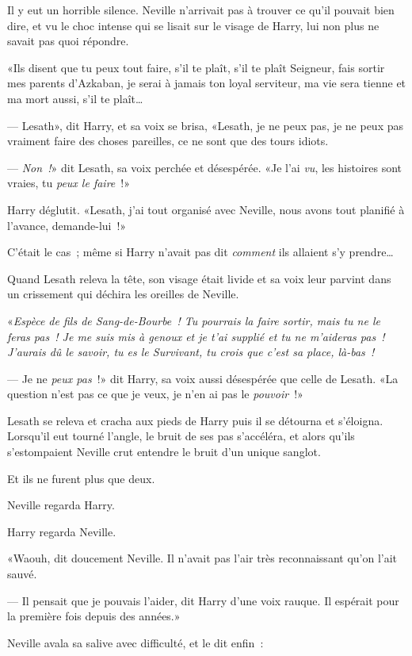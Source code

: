 Il y eut un horrible silence. Neville n'arrivait pas à trouver ce qu'il pouvait bien dire, et vu le choc intense qui se lisait sur le visage de Harry, lui non plus ne savait pas quoi répondre.

«Ils disent que tu peux tout faire, s'il te plaît, s'il te plaît Seigneur, fais sortir mes parents d'Azkaban, je serai à jamais ton loyal serviteur, ma vie sera tienne et ma mort aussi, s'il te plaît…

--- Lesath», dit Harry, et sa voix se brisa, «Lesath, je ne peux pas, je ne peux pas vraiment faire des choses pareilles, ce ne sont que des tours idiots.

--- \emph{Non~!}» dit Lesath, sa voix perchée et désespérée. «Je l'ai \emph{vu}, les histoires sont vraies, tu \emph{peux le faire}~!»

Harry déglutit. «Lesath, j'ai tout organisé avec Neville, nous avons tout planifié à l'avance, demande-lui~!»

C'était le cas~; même si Harry n'avait pas dit \emph{comment} ils allaient s'y prendre…

Quand Lesath releva la tête, son visage était livide et sa voix leur parvint dans un crissement qui déchira les oreilles de Neville.

«\emph{Espèce de fils de Sang-de-Bourbe~! Tu pourrais la faire sortir, mais tu ne le feras pas~! Je me suis mis à genoux et je t'ai supplié et tu ne m'aideras pas~! J'aurais dû le savoir, tu es le Survivant, tu crois que c'est sa place, là-bas~!}

--- Je ne \emph{peux pas}~!» dit Harry, sa voix aussi désespérée que celle de Lesath. «La question n'est pas ce que je veux, je n'en ai pas le \emph{pouvoir}~!»

Lesath se releva et cracha aux pieds de Harry puis il se détourna et s'éloigna. Lorsqu'il eut tourné l'angle, le bruit de ses pas s'accéléra, et alors qu'ils s'estompaient Neville crut entendre le bruit d'un unique sanglot.

Et ils ne furent plus que deux.

Neville regarda Harry.

Harry regarda Neville.

«Waouh, dit doucement Neville. Il n'avait pas l'air très reconnaissant qu'on l'ait sauvé.

--- Il pensait que je pouvais l'aider, dit Harry d'une voix rauque. Il espérait pour la première fois depuis des années.»

Neville avala sa salive avec difficulté, et le dit enfin~:

